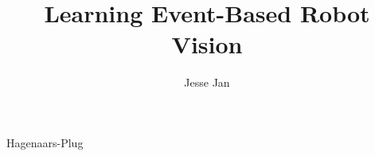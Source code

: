 \documentclass{dissertation}
\begin{document}
	\title{Learning Event-Based Robot Vision}
	\author{Jesse Jan}{Hagenaars-Plug}
	
	
	\frontmatter
	
	
	\tableofcontents
	
	
	\mainmatter
	\thumbtrue
	
	
	
	
	
	
	
	
	\thumbfalse
	
	
	
	
	
	
	\newpage
	\thispagestyle{empty}
	\phantom{blabla}
	\newpage
	
	\newpage
	\thispagestyle{empty}
	\phantom{blabla}
	\newpage
	
	
\end{document}

